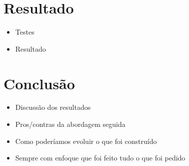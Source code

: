 \documentclass[12pt, a4paper]{report}
\begin{document}
\chapter{Resultado}
\begin{itemize}
    \item Testes
    \item Resultado
\end{itemize}


\chapter{Conclusão}
\begin{itemize}
    \item Discussão dos resultados
    \item Pros/contras da abordagem seguida
    \item Como poderíamos evoluir o que foi construído
    \item Sempre com enfoque que foi feito tudo o que foi pedido
\end{itemize}
\end{document}
